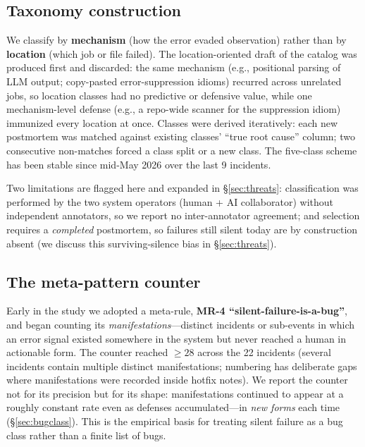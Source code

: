 \subsection{Taxonomy construction}\label{sec:construction}

We classify by \textbf{mechanism} (how the error evaded observation)
rather than by \textbf{location} (which job or file failed). The
location-oriented draft of the catalog was produced first and discarded:
the same mechanism (e.g., positional parsing of LLM output; copy-pasted
error-suppression idioms) recurred across unrelated jobs, so location
classes had no predictive or defensive value, while one mechanism-level
defense (e.g., a repo-wide scanner for the suppression idiom) immunized
every location at once. Classes were derived iteratively: each new
postmortem was matched against existing classes' ``true root cause''
column; two consecutive non-matches forced a class split or a new class.
The five-class scheme has been stable since mid-May 2026 over the last 9
incidents.

Two limitations are flagged here and expanded in
\S\ref{sec:threats}: classification was performed by the two system
operators (human + AI collaborator) without independent annotators, so we
report no inter-annotator agreement; and selection requires a
\emph{completed} postmortem, so failures still silent today are by
construction absent (we discuss this surviving-silence bias in
\S\ref{sec:threats}).

\subsection{The meta-pattern counter}\label{sec:counter}

Early in the study we adopted a meta-rule, \textbf{MR-4
``silent-failure-is-a-bug''}, and began counting its
\emph{manifestations}---distinct incidents or sub-events in which an
error signal existed somewhere in the system but never reached a human in
actionable form. The counter reached ${\geq}28$ across the 22 incidents
(several incidents contain multiple distinct manifestations; numbering
has deliberate gaps where manifestations were recorded inside hotfix
notes). We report the counter not for its precision but for its shape:
manifestations continued to appear at a roughly constant rate even as
defenses accumulated---in \emph{new forms} each time
(\S\ref{sec:bugclass}). This is the empirical basis for treating silent
failure as a bug class rather than a finite list of bugs.
